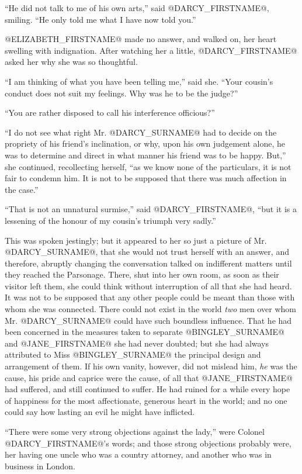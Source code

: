 ``He did not talk to me of his own arts,'' said @DARCY_FIRSTNAME@, smiling. ``He
only told me what I have now told you.''

@ELIZABETH_FIRSTNAME@ made no answer, and walked on, her heart swelling with
indignation. After watching her a little, @DARCY_FIRSTNAME@ asked her why she
was so thoughtful.

``I am thinking of what you have been telling me,'' said she. ``Your
cousin's conduct does not suit my feelings. Why was he to be the judge?''

``You are rather disposed to call his interference officious?''

``I do not see what right Mr. @DARCY_SURNAME@ had to decide on the propriety of his
friend's inclination, or why, upon his own judgement alone, he was to
determine and direct in what manner his friend was to be happy.
But,'' she continued, recollecting herself, ``as we know none of the
particulars, it is not fair to condemn him. It is not to be supposed
that there was much affection in the case.''

``That is not an unnatural surmise,'' said @DARCY_FIRSTNAME@, ``but it is a
lessening of the honour of my cousin's triumph very sadly.''

This was spoken jestingly; but it appeared to her so just a picture
of Mr. @DARCY_SURNAME@, that she would not trust herself with an answer, and
therefore, abruptly changing the conversation talked on indifferent
matters until they reached the Parsonage. There, shut into her own room,
as soon as their visitor left them, she could think without interruption
of all that she had heard. It was not to be supposed that any other
people could be meant than those with whom she was connected. There
could not exist in the world \textit{two} men over whom Mr. @DARCY_SURNAME@ could have
such boundless influence. That he had been concerned in the measures
taken to separate @BINGLEY_SURNAME@ and @JANE_FIRSTNAME@ she had never doubted; but she had
always attributed to Miss @BINGLEY_SURNAME@ the principal design and arrangement
of them. If his own vanity, however, did not mislead him, \textit{he} was
the cause, his pride and caprice were the cause, of all that @JANE_FIRSTNAME@ had
suffered, and still continued to suffer. He had ruined for a while
every hope of happiness for the most affectionate, generous heart in the
world; and no one could say how lasting an evil he might have inflicted.

``There were some very strong objections against the lady,'' were Colonel
@DARCY_FIRSTNAME@'s words; and those strong objections probably were, her
having one uncle who was a country attorney, and another who was in
business in London.

